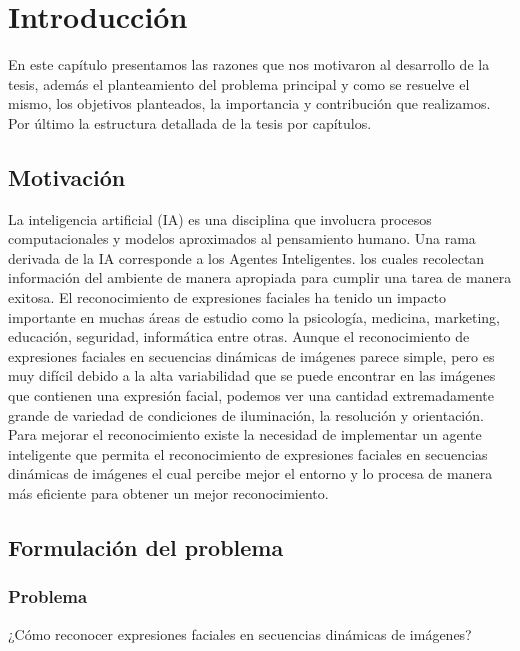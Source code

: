 \chapter{Introducción}
\setcounter{page}{1}

En este capítulo presentamos las razones que nos motivaron al desarrollo de la tesis, además el planteamiento del problema principal y como se resuelve el mismo, los objetivos planteados, la importancia y contribución que realizamos. Por último la estructura detallada de la tesis por capítulos.   

\section{Motivación}

La inteligencia artificial (IA) es una disciplina que involucra procesos computacionales y modelos aproximados al pensamiento humano. Una rama derivada de la IA corresponde a los Agentes Inteligentes. los cuales recolectan información del ambiente de manera apropiada para cumplir una tarea de manera exitosa.
\vskip 0.3cm
El reconocimiento de expresiones faciales ha tenido un impacto importante en muchas áreas de estudio como la psicología,  medicina, marketing, educación, seguridad, informática entre otras.
\vskip 0.3cm
Aunque el reconocimiento de expresiones faciales en secuencias dinámicas de imágenes parece simple, pero es muy difícil debido a la alta variabilidad que se puede encontrar en las imágenes que contienen una expresión facial, podemos ver una cantidad extremadamente grande de variedad de condiciones de iluminación, la resolución y orientación. 
\vskip 0.3cm
Para mejorar el reconocimiento existe la necesidad de implementar un agente inteligente que permita el reconocimiento de expresiones faciales en secuencias dinámicas de imágenes el cual percibe mejor el entorno y lo procesa de manera más eficiente para obtener un mejor reconocimiento.

\section{Formulación del problema}
\subsection{Problema}

 \begin{center}   
     ¿Cómo reconocer expresiones faciales en secuencias dinámicas de imágenes?
 \end{center}

